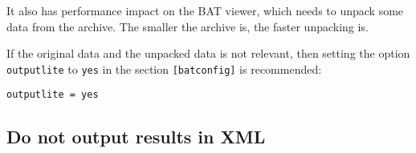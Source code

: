 \documentclass[10pt]{article}
\begin{document}
It also has performance impact on the BAT viewer, which needs to unpack some
data from the archive. The smaller the archive is, the faster unpacking is.

If the original data and the unpacked data is not relevant, then setting the
option \texttt{outputlite} to \texttt{yes} in the section \texttt{[batconfig]}
is recommended:

\begin{verbatim}
outputlite = yes
\end{verbatim}

\subsection{Do not output results in XML}
\end{document}
